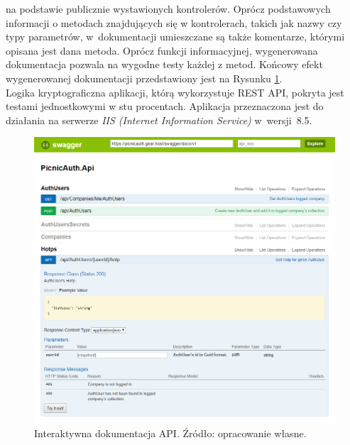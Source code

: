 na podstawie publicznie wystawionych kontrolerów. 
Oprócz podstawowych informacji o metodach znajdujących się w kontrolerach, takich jak nazwy czy typy parametrów, 
w~dokumentacji umieszczane są także komentarze, którymi opisana jest dana metoda. Oprócz funkcji informacyjnej, 
wygenerowana dokumentacja pozwala na wygodne testy każdej z metod. 
Końcowy efekt wygenerowanej dokumentacji przedstawiony jest na Rysunku \ref{swagger}. \\
Logika kryptograficzna aplikacji, którą wykorzystuje REST API, pokryta jest testami jednostkowymi w stu procentach.
Aplikacja przeznaczona jest do działania na serwerze \textit{IIS (Internet Information Service)} w~wersji~8.5.
\begin{figure}[t]
    \centering
	\includegraphics[width=\textwidth]{content/images/swagger}
    \caption{Interaktywna dokumentacja API. Źródło: opracowanie własne.}
    \label{swagger}
\end{figure}

